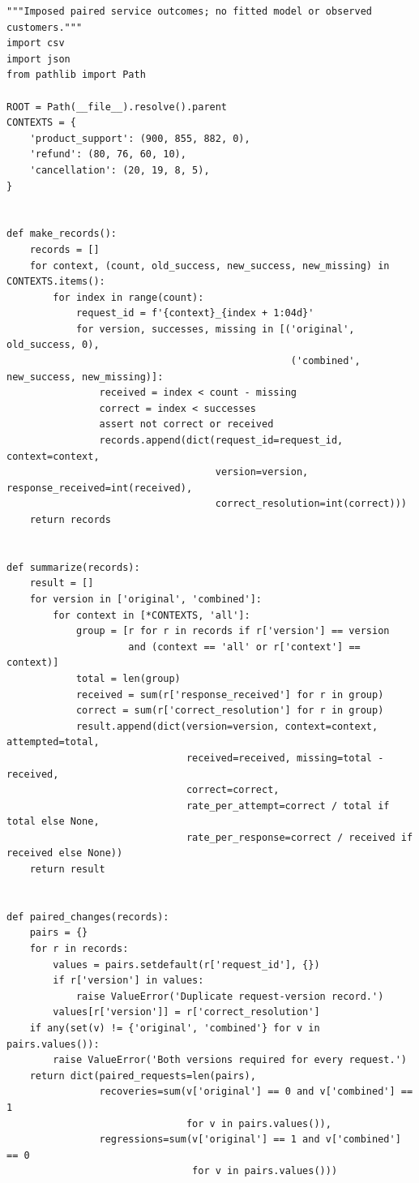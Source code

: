 \begin{Verbatim}[breaklines,breakanywhere,fontsize=\small]
"""Imposed paired service outcomes; no fitted model or observed customers."""
import csv
import json
from pathlib import Path

ROOT = Path(__file__).resolve().parent
CONTEXTS = {
    'product_support': (900, 855, 882, 0),
    'refund': (80, 76, 60, 10),
    'cancellation': (20, 19, 8, 5),
}


def make_records():
    records = []
    for context, (count, old_success, new_success, new_missing) in CONTEXTS.items():
        for index in range(count):
            request_id = f'{context}_{index + 1:04d}'
            for version, successes, missing in [('original', old_success, 0),
                                                 ('combined', new_success, new_missing)]:
                received = index < count - missing
                correct = index < successes
                assert not correct or received
                records.append(dict(request_id=request_id, context=context,
                                    version=version, response_received=int(received),
                                    correct_resolution=int(correct)))
    return records


def summarize(records):
    result = []
    for version in ['original', 'combined']:
        for context in [*CONTEXTS, 'all']:
            group = [r for r in records if r['version'] == version
                     and (context == 'all' or r['context'] == context)]
            total = len(group)
            received = sum(r['response_received'] for r in group)
            correct = sum(r['correct_resolution'] for r in group)
            result.append(dict(version=version, context=context, attempted=total,
                               received=received, missing=total - received,
                               correct=correct,
                               rate_per_attempt=correct / total if total else None,
                               rate_per_response=correct / received if received else None))
    return result


def paired_changes(records):
    pairs = {}
    for r in records:
        values = pairs.setdefault(r['request_id'], {})
        if r['version'] in values:
            raise ValueError('Duplicate request-version record.')
        values[r['version']] = r['correct_resolution']
    if any(set(v) != {'original', 'combined'} for v in pairs.values()):
        raise ValueError('Both versions required for every request.')
    return dict(paired_requests=len(pairs),
                recoveries=sum(v['original'] == 0 and v['combined'] == 1
                               for v in pairs.values()),
                regressions=sum(v['original'] == 1 and v['combined'] == 0
                                for v in pairs.values()))



\end{Verbatim}
